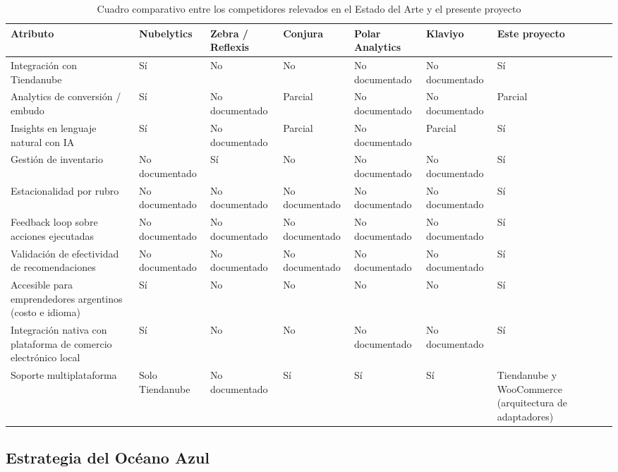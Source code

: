 \begin{table}[h]
\centering
\caption{Cuadro comparativo entre los competidores relevados en el Estado del Arte y el presente proyecto}
\label{tab:comparativo_nubelytics}
\renewcommand{\arraystretch}{1.3}
\footnotesize
\setlength{\tabcolsep}{3pt}
\begin{tabular}{|m{2.9cm}|m{1.75cm}|m{1.75cm}|m{1.75cm}|m{1.75cm}|m{1.75cm}|m{2cm}|}
\hline
\textbf{Atributo} & \textbf{Nubelytics} & \textbf{Zebra / Reflexis} & \textbf{Conjura} & \textbf{Polar Analytics} & \textbf{Klaviyo} & \textbf{Este proyecto} \\
\hline
Integración con Tiendanube & Sí & No & No & No documentado & No documentado & Sí \\
\hline
Analytics de conversión / embudo & Sí & No documentado & Parcial & No documentado & No documentado & Parcial \\
\hline
Insights en lenguaje natural con IA & Sí & No documentado & Parcial & No documentado & Parcial & Sí \\
\hline
Gestión de inventario & No documentado & Sí & No & No documentado & No documentado & Sí \\
\hline
Estacionalidad por rubro & No documentado & No documentado & No documentado & No documentado & No documentado & Sí \\
\hline
Feedback loop sobre acciones ejecutadas & No documentado & No documentado & No documentado & No documentado & No documentado & Sí \\
\hline
Validación de efectividad de recomendaciones & No documentado & No documentado & No documentado & No documentado & No documentado & Sí \\
\hline
Accesible para emprendedores argentinos (costo e idioma) & Sí & No & No & No & No & Sí \\
\hline
Integración nativa con plataforma de comercio electrónico local & Sí & No & No & No documentado & No documentado & Sí \\
\hline
	Soporte multiplataforma & Solo Tiendanube & No documentado & Sí & Sí & Sí & Tiendanube y WooCommerce (arquitectura de adaptadores) \\
\hline
\end{tabular}
\end{table}

\subsection{Estrategia del Océano Azul}
\label{sec:oceano-azul}


